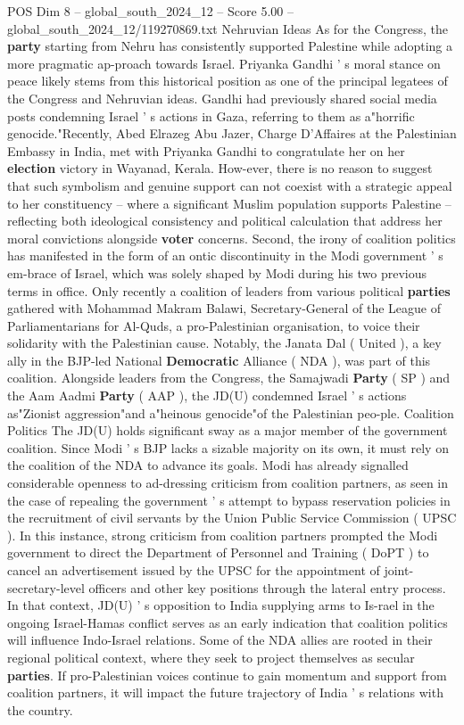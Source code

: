 \begin{textsample}{POS Dim 8 – global\_south\_2024\_12 – Score 5.00 – global\_south\_2024\_12/119270869.txt}
Nehruvian Ideas As for the Congress, the \textbf{party} starting from Nehru has consistently supported Palestine while adopting a more pragmatic ap-proach towards Israel.
Priyanka Gandhi ' s moral stance on peace likely stems from this historical position as one of the principal legatees of the Congress and Nehruvian ideas.
Gandhi had previously shared social media posts condemning Israel ' s actions in Gaza, referring to them as a"horrific genocide."Recently, Abed Elrazeg Abu Jazer, Charge D'Affaires at the Palestinian Embassy in India, met with Priyanka Gandhi to congratulate her on her \textbf{election} victory in Wayanad, Kerala.
How-ever, there is no reason to suggest that such symbolism and genuine support can not coexist with a strategic appeal to her constituency -- where a significant Muslim population supports Palestine -- reflecting both ideological consistency and political calculation that address her moral convictions alongside \textbf{voter} concerns.
Second, the irony of coalition politics has manifested in the form of an ontic discontinuity in the Modi government ' s em-brace of Israel, which was solely shaped by Modi during his two previous terms in office.
Only recently a coalition of leaders from various political \textbf{parties} gathered with Mohammad Makram Balawi, Secretary-General of the League of Parliamentarians for Al-Quds, a pro-Palestinian organisation, to voice their solidarity with the Palestinian cause.
Notably, the Janata Dal ( United ), a key ally in the BJP-led National \textbf{Democratic} Alliance ( NDA ), was part of this coalition.
Alongside leaders from the Congress, the Samajwadi \textbf{Party} ( SP ) and the Aam Aadmi \textbf{Party} ( AAP ), the JD(U) condemned Israel ' s actions as"Zionist aggression"and a"heinous genocide"of the Palestinian peo-ple.
Coalition Politics The JD(U) holds significant sway as a major member of the government coalition.
Since Modi ' s BJP lacks a sizable majority on its own, it must rely on the coalition of the NDA to advance its goals.
Modi has already signalled considerable openness to ad-dressing criticism from coalition partners, as seen in the case of repealing the government ' s attempt to bypass reservation policies in the recruitment of civil servants by the Union Public Service Commission ( UPSC ).
In this instance, strong criticism from coalition partners prompted the Modi government to direct the Department of Personnel and Training ( DoPT ) to cancel an advertisement issued by the UPSC for the appointment of joint-secretary-level officers and other key positions through the lateral entry process.
In that context, JD(U) ' s opposition to India supplying arms to Is-rael in the ongoing Israel-Hamas conflict serves as an early indication that coalition politics will influence Indo-Israel relations.
Some of the NDA allies are rooted in their regional political context, where they seek to project themselves as secular \textbf{parties}.
If pro-Palestinian voices continue to gain momentum and support from coalition partners, it will impact the future trajectory of India ' s relations with the country.

\end{textsample}
